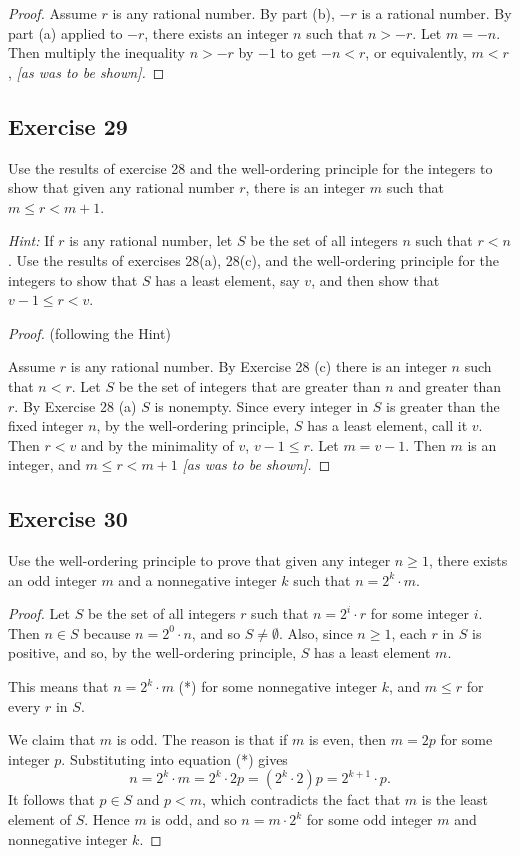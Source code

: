 \documentclass[14pt]{extarticle}
\begin{document}
\begin{proof}
Assume $r$ is any rational number.
By part (b), $-r$ is a rational number.
By part (a) applied to $-r$, there exists an integer $n$ such that $n > -r$. Let $m = -n$. 
Then multiply the inequality $n > -r$ by $-1$ to get $-n < r$, or equivalently, $m < r$, {\it [as was to be shown].}
\end{proof}

\subsection{Exercise 29}
Use the results of exercise 28 and the well-ordering principle for the integers to show that given any rational number $r$, there is an integer $m$ such that $m \leq r < m + 1$.

{\it Hint:} If $r$ is any rational number, let $S$ be the set of all integers $n$ such that $r < n$. 
Use the results of exercises 28(a), 28(c), and the well-ordering principle for the integers to show that $S$ has a
least element, say $v$, and then show that $v - 1 \leq r < v$.

\begin{proof}
(following the Hint)

Assume $r$ is any rational number. 
By Exercise 28 (c) there is an integer $n$ such that $n < r$.
Let $S$ be the set of integers that are greater than $n$ and greater than $r$. By Exercise 28 (a) $S$ is nonempty.
Since every integer in $S$ is greater than the fixed integer $n$, by the well-ordering principle, 
$S$ has a least element, call it $v$.
Then $r < v$ and by the minimality of $v$, $v-1 \leq r$.
Let $m = v-1$. Then $m$ is an integer, and $m \leq r < m+1$ {\it [as was to be shown].}

\end{proof}

\subsection{Exercise 30}
Use the well-ordering principle to prove that given any integer $n \geq 1$, there exists an odd integer $m$ and a nonnegative integer $k$ such that $n = 2^k \cdot m$.

\begin{proof}
Let $S$ be the set of all integers $r$ such that $n = 2^i \cdot r$ for some integer $i$. 
Then $n \in S$ because $n = 2^0 \cdot n$, and so $S \neq \emptyset$. 
Also, since $n \geq 1$, each $r$ in $S$ is positive, and so, by the well-ordering principle, $S$ has a least element 
$m$. 

This means that $n = 2^k \cdot m$ (*) for some nonnegative integer $k$, and $m \leq r$ for every $r$ in $S$. 

We claim that $m$ is odd. The reason is that if $m$ is even, then $m = 2p$ for some integer $p$. 
Substituting into equation (*) gives 
\[
n = 2^k \cdot m = 2^k \cdot 2p = (2^k \cdot 2)p = 2^{k+1} \cdot p.
\]
It follows that $p \in S$ and $p < m$, which contradicts the fact that $m$ is the least element of $S$. 
Hence $m$ is odd, and so $n = m \cdot 2^k$ for some odd integer $m$ and nonnegative integer $k$.
\end{proof}
\end{document}

